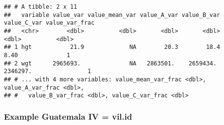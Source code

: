 \documentclass[
]{book}
\newenvironment{Shaded}{\begin{snugshade}}{\end{snugshade}}
\newcommand{\DataTypeTok}[1]{\textcolor[rgb]{0.13,0.29,0.53}{#1}}
\newcommand{\DecValTok}[1]{\textcolor[rgb]{0.00,0.00,0.81}{#1}}
\newcommand{\KeywordTok}[1]{\textcolor[rgb]{0.13,0.29,0.53}{\textbf{#1}}}
\newcommand{\NormalTok}[1]{#1}
\newcommand{\OperatorTok}[1]{\textcolor[rgb]{0.81,0.36,0.00}{\textbf{#1}}}
\newcommand{\OtherTok}[1]{\textcolor[rgb]{0.56,0.35,0.01}{#1}}
\newcommand{\StringTok}[1]{\textcolor[rgb]{0.31,0.60,0.02}{#1}}
\begin{document}
\begin{Shaded}
\end{Shaded}

\begin{verbatim}
## # A tibble: 2 x 11
##   variable value_var value_mean_var value_A_var value_B_var value_C_var value_var_frac
##   <chr>        <dbl>          <dbl>       <dbl>       <dbl>       <dbl>          <dbl>
## 1 hgt           21.9             NA        20.3        18.4        8.40              1
## 2 wgt      2965693.              NA   2863501.    2659434.   2346297.                1
## # ... with 4 more variables: value_mean_var_frac <dbl>, value_A_var_frac <dbl>,
## #   value_B_var_frac <dbl>, value_C_var_frac <dbl>
\end{verbatim}

\hypertarget{example-guatemala-iv-vil.id}{%
\subsubsection{Example Guatemala IV = vil.id}\label{example-guatemala-iv-vil.id}}

\begin{Shaded}
\end{Shaded}
\end{document}
